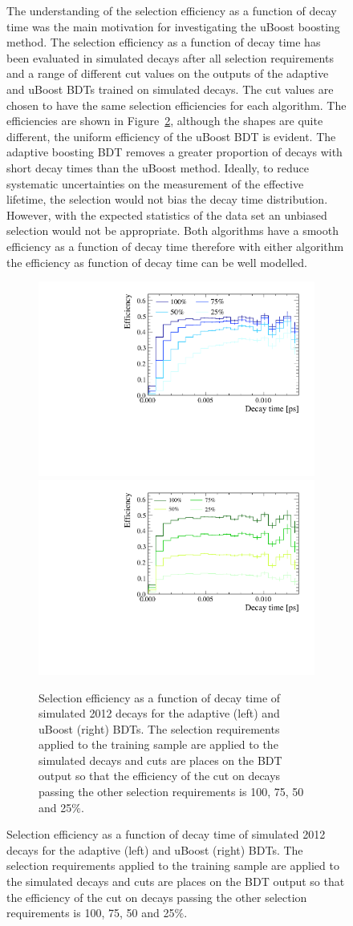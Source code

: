 \begin{figure}[tbp]
The understanding of the selection efficiency as a function of decay time was the main motivation for investigating the uBoost boosting method. %
The selection efficiency as a function of decay time has been evaluated in simulated \bsmumu decays after all selection requirements and a range of different cut values on the outputs of the adaptive and uBoost BDTs trained on simulated decays. The cut values are chosen to have the same selection efficiencies for each algorithm. The efficiencies are shown in Figure~\ref{fig:accptsELBDTs}, although the shapes are quite different, the uniform efficiency of the uBoost BDT is evident. The adaptive boosting BDT removes a greater proportion of decays with short decay times than the uBoost method. Ideally, to reduce systematic uncertainties on the measurement of the effective lifetime, the selection would not bias the decay time distribution. However, with the expected statistics of the data set an unbiased selection would not be appropriate. Both algorithms have a smooth efficiency as a function of decay time therefore with either algorithm the efficiency as function of decay time can be well modelled. 
\begin{figure}[htbp]
    \centering
        \includegraphics[width=0.49 \textwidth]{./Figs/Selection/BDT_acceptances.pdf}
       \includegraphics[width=0.49 \textwidth]{./Figs/Selection/uBoost_accpt.pdf}
    \caption{Selection efficiency as a function of decay time of simulated 2012 \bsmumu decays for the adaptive (left) and uBoost (right) BDTs. The selection requirements applied to the training sample are applied to the simulated decays and cuts are places on the BDT output so that the efficiency of the cut on decays passing the other selection requirements is 100, 75, 50 and 25$\%$. }
    \label{fig:accptsELBDTs}
\end{figure}


\end{figure}

